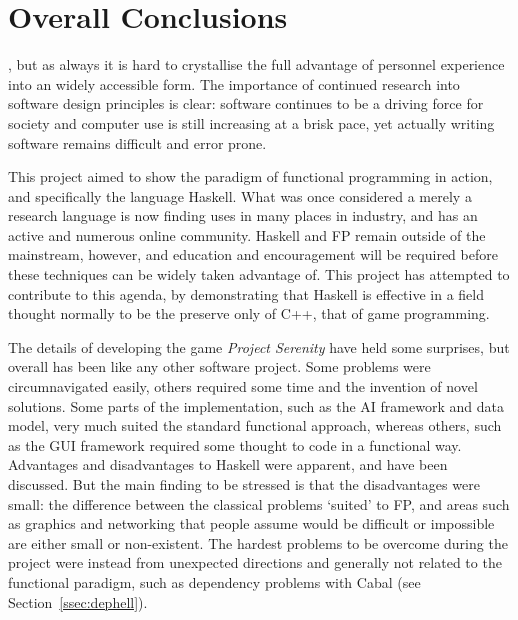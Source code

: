 \chapter[Overall Conclusions]{Overall Conclusions}
\label{ch:conclusions}


, but as always it is hard to crystallise the full advantage of personnel experience into an widely accessible form. The importance of continued research into software design principles is clear: software continues to be a driving force for society and computer use is still increasing at a brisk pace,\cite{borodovsky2006marching} yet actually writing software remains difficult and error prone.\cite[1em]{paulk1993capability} 

This project aimed to show the paradigm of functional programming in action, and specifically the language Haskell. What was once considered a merely a research language is now finding uses in many places in industry, and has an active and numerous online community. Haskell and FP remain outside of the mainstream, however, and education and encouragement will be required before these techniques can be widely taken advantage of. This project has attempted to contribute to this agenda, by demonstrating that Haskell is effective in a field thought normally to be the preserve only of C++, that of game programming. 

The details of developing the game \emph{Project Serenity} have held some surprises, but overall has been like any other software project. Some problems were circumnavigated easily, others required some time and the invention of novel solutions. Some parts of the implementation, such as the AI framework and data model, very much suited the standard functional approach, whereas others, such as the GUI framework required some thought to code in a functional way. Advantages and disadvantages to Haskell were apparent, and have been discussed. But the main finding to be stressed is that the disadvantages were small: the difference between the classical problems `suited' to FP, and areas such as graphics and networking that people assume would be difficult or impossible are either small or non-existent. The hardest problems to be overcome during the project were instead from unexpected directions and generally not related to the functional paradigm, such as dependency problems with Cabal (see Section~\ref{ssec:dephell}).

